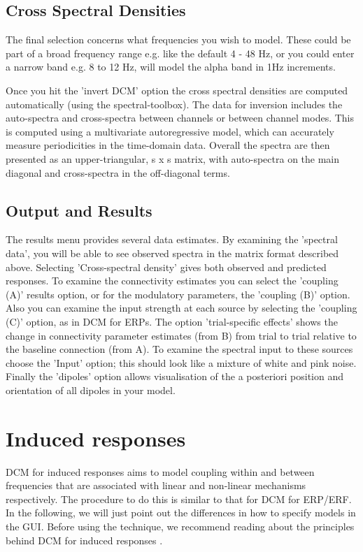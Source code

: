 \subsection{Cross Spectral Densities}
The final selection concerns what frequencies you wish to model. These could be part of a broad frequency range e.g. like the default 4 - 48 Hz, or you could enter a narrow band e.g. 8 to 12 Hz, will model the alpha band in 1Hz increments.

Once you hit the 'invert DCM' option the cross spectral densities are computed automatically (using the spectral-toolbox). The data for inversion includes the auto-spectra and cross-spectra between channels or between channel modes. This is computed using a multivariate autoregressive model, which can accurately measure periodicities in the time-domain data. Overall the spectra are then presented as an upper-triangular, s x s matrix, with auto-spectra on the main diagonal and cross-spectra in the off-diagonal terms.

\subsection{Output and Results}
The results menu provides several data estimates. By examining the 'spectral data', you will be able to see observed spectra in the matrix format described above. Selecting 'Cross-spectral density' gives both observed and predicted responses. To examine the connectivity estimates you can select the 'coupling (A)' results option, or for the modulatory parameters, the 'coupling (B)' option. Also you can examine the input strength at each source by selecting the 'coupling (C)' option, as in DCM for ERPs. The option 'trial-specific effects' shows the change in connectivity parameter estimates (from B) from trial to trial relative to the baseline connection (from A). To examine the spectral input to these sources choose the 'Input' option; this should look like a mixture of white and pink noise. Finally the 'dipoles' option allows visualisation of the a posteriori position and orientation of all dipoles in your model.

\section{Induced responses}
DCM for induced responses aims to model coupling within and between frequencies that are associated with linear and non-linear mechanisms respectively. The procedure to do this is similar to that for DCM for ERP/ERF. In the following, we will just point out the differences in how to specify models in the GUI. Before using the technique, we recommend reading about the principles behind DCM for induced responses \cite{cc_induced}.

